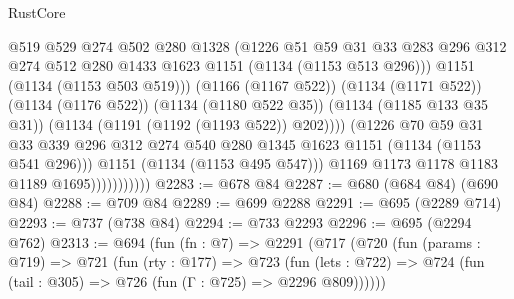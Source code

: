 \begin{lexlean}{RustCore}
\begin{coremodule}
{\begin{coremodule}
{{{{{{{{{                                  @519
                                  @529
                                  @274
                                  @502
                                  @280
                                  @1328
                                  (@1226
                                    @51
                                    @59
                                    @31
                                    @33
                                    @283
                                    @296
                                    @312
                                    @274
                                    @512
                                    @280
                                    @1433
                                    @1623
                                    @1151
                                    (@1134 (@1153 @513 @296)))
                                  @1151
                                  (@1134 (@1153 @503 @519)))
                                (@1166 (@1167 @522))
                                (@1134 (@1171 @522))
                                (@1134 (@1176 @522))
                                (@1134 (@1180 @522 @35))
                                (@1134 (@1185 @133 @35 @31))
                                (@1134 (@1191 (@1192 (@1193 @522)) @202))))
                            (@1226
                              @70
                              @59
                              @31
                              @33
                              @339
                              @296
                              @312
                              @274
                              @540
                              @280
                              @1345
                              @1623
                              @1151
                              (@1134 (@1153 @541 @296)))
                            @1151
                            (@1134 (@1153 @495 @547)))
                          @1169
                          @1173
                          @1178
                          @1183
                          @1189
                          @1695)))))))))))
@2283 := @678 @84
@2287 := @680 (@684 @84) (@690 @84)
@2288 := @709 @84
@2289 := @699 @2288
@2291 := @695 (@2289 @714)
@2293 := @737 (@738 @84)
@2294 := @733 @2293
@2296 := @695 (@2294 @762)
@2313 := @694
    (fun (fn : @7) =>
    @2291
      (@717
        (@720
          (fun (params : @719) =>
          @721
            (fun (rty : @177) =>
            @723
              (fun (lets : @722) =>
              @724 (fun (tail : @305) => @726 (fun (Γ : @725) => @2296 @809))))))
}}}}}}}}}
\end{coremodule}}
\end{coremodule}
\end{lexlean}
